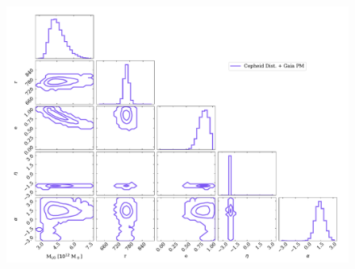 \documentclass[twocolumn]{aastex631}
\begin{document}
\begin{figure}[htb]
  \centering
  \includegraphics[width=0.8\columnwidth]{analyze-runs-all-fiducial2021.pdf}
  \caption{\label{fig:contour-fiducial}
  }
\end{figure}


{}

\end{document}
